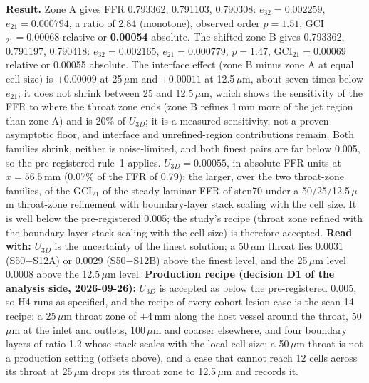 \documentclass[11pt]{article}
\begin{document}
\textbf{Result.} Zone A gives FFR 0.793362, 0.791103, 0.790308: $e_{32}=0.002259$, $e_{21}=0.000794$, a ratio of 2.84 (monotone), observed order $p=1.51$, GCI$_{21}=0.00068$ relative or \textbf{0.00054} absolute. The shifted zone B gives 0.793362, 0.791197, 0.790418: $e_{32}=0.002165$, $e_{21}=0.000779$, $p=1.47$, GCI$_{21}=0.00069$ relative or 0.00055 absolute. The interface effect (zone B minus zone A at equal cell size) is $+0.00009$ at 25\,$\mu$m and $+0.00011$ at 12.5\,$\mu$m, about seven times below $e_{21}$; it does not shrink between 25 and 12.5\,$\mu$m, which shows the sensitivity of the FFR to where the throat zone ends (zone B refines 1\,mm more of the jet region than zone A) and is 20\% of $U_{3D}$; it is a measured sensitivity, not a proven asymptotic floor, and interface and unrefined-region contributions remain. Both families shrink, neither is noise-limited, and both finest pairs are far below 0.005, so the pre-registered rule~1 applies. \textbf{$U_{3D}=0.00055$}, in absolute FFR units at $x=56.5$\,mm (0.07\% of the FFR of 0.79): the larger, over the two throat-zone families, of the GCI$_{21}$ of the steady laminar FFR of sten70 under a 50/25/12.5\,$\mu$m throat-zone refinement with boundary-layer stack scaling with the cell size. It is well below the pre-registered 0.005; the study's recipe (throat zone refined with the boundary-layer stack scaling with the cell size) is therefore accepted. \textbf{Read with:} $U_{3D}$ is the uncertainty of the finest solution; a 50\,$\mu$m throat lies 0.0031 (S50$-$S12A) or 0.0029 (S50$-$S12B) above the finest level, and the 25\,$\mu$m level 0.0008 above the 12.5\,$\mu$m level. \textbf{Production recipe (decision D1 of the analysis side, 2026-09-26):} $U_{3D}$ is accepted as below the pre-registered 0.005, so H4 runs as specified, and the recipe of every cohort lesion case is the scan-14 recipe: a 25\,$\mu$m throat zone of $\pm4$\,mm along the host vessel around the throat, 50\,$\mu$m at the inlet and outlets, 100\,$\mu$m and coarser elsewhere, and four boundary layers of ratio 1.2 whose stack scales with the local cell size; a 50\,$\mu$m throat is not a production setting (offsets above), and a case that cannot reach 12 cells across its throat at 25\,$\mu$m drops its throat zone to 12.5\,$\mu$m and records it.
\end{document}
